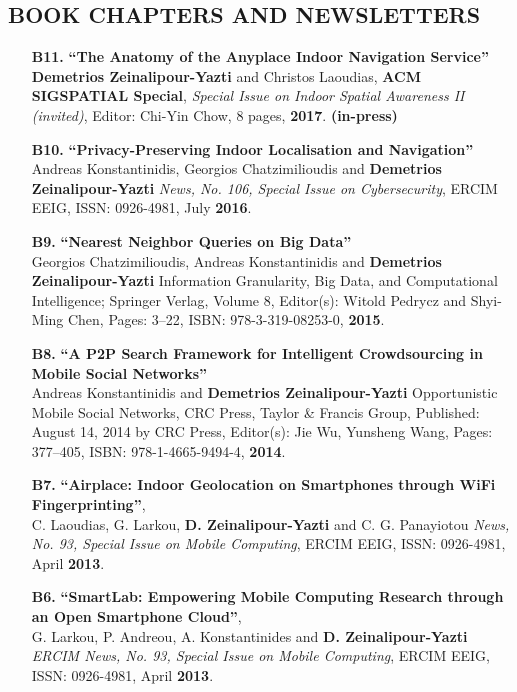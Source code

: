 \documentclass[10pt]{article}
\begin{document}
\subsection*{BOOK CHAPTERS AND NEWSLETTERS}
\begin{enumerate}

\item[{\bf B11.}]
\label{B11}
{\bf ``The Anatomy of the Anyplace Indoor Navigation Service''} \\
{\bf Demetrios Zeinalipour-Yazti} and Christos Laoudias, 
{\bf ACM SIGSPATIAL Special}, {\em Special Issue on Indoor Spatial Awareness II (invited)},
Editor: Chi-Yin Chow, 8 pages, {\bf 2017}. {\bf (in-press)}

\item[{\bf B10.}]
\label{B10}
{\bf ``Privacy-Preserving Indoor Localisation and Navigation''} \\
Andreas Konstantinidis, Georgios Chatzimilioudis and {\bf Demetrios Zeinalipour-Yazti}
{\em  News, No. 106, Special Issue on Cybersecurity}, ERCIM EEIG, ISSN: 0926-4981, July {\bf 2016}.

\item[{\bf B9.}]
\label{B9}
{\bf ``Nearest Neighbor Queries on Big Data''} \\
Georgios Chatzimilioudis, Andreas Konstantinidis and {\bf Demetrios Zeinalipour-Yazti}
Information Granularity, Big Data, and Computational Intelligence; Springer Verlag, Volume 8,
Editor(s): Witold Pedrycz and Shyi-Ming Chen, Pages: 3--22, ISBN: 978-3-319-08253-0, {\bf 2015}.

%
\item[{\bf B8.}] 
\label{B8}
{\bf ``A P2P Search Framework for Intelligent Crowdsourcing in Mobile Social Networks''} \\
Andreas Konstantinidis and {\bf Demetrios Zeinalipour-Yazti}
Opportunistic Mobile Social Networks, CRC Press, Taylor \& Francis Group, Published: August 14, 2014 by CRC Press, Editor(s): Jie Wu, Yunsheng Wang, Pages: 377--405, ISBN: 978-1-4665-9494-4, {\bf 2014}.

\item[{\bf B7.}]
\label{B7}
{\bf ``Airplace: Indoor Geolocation on Smartphones through WiFi Fingerprinting''}, \\
C. Laoudias, G. Larkou, {\bf D. Zeinalipour-Yazti} and C. G. Panayiotou
{\em  News, No. 93, Special Issue on Mobile Computing}, ERCIM EEIG, ISSN: 0926-4981, April {\bf 2013}.

\item[{\bf B6.}]
\label{B6}
{\bf ``SmartLab: Empowering Mobile Computing Research through an Open Smartphone Cloud''}, \\
G. Larkou, P. Andreou, A. Konstantinides and {\bf D. Zeinalipour-Yazti}
{\em ERCIM News, No. 93, Special Issue on Mobile Computing}, ERCIM EEIG, ISSN: 0926-4981, April {\bf 2013}.
 

\end{enumerate}
\end{document}
